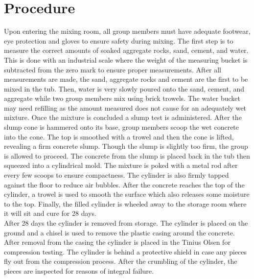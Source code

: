\documentclass{article}
\begin{document}
    \section{Procedure}
    \indent Upon entering the mixing room, all group members must have adequate footwear, eye protection and gloves to ensure safety during mixing. The first step is to measure the correct amounts of soaked aggregate rocks, sand, cement, and water. This is done with an industrial scale where the weight of the measuring bucket is subtracted from the zero mark to ensure proper measurements. After all measurements are made, the sand, aggregate rocks and cement are the first to be mixed in the tub. Then, water is very slowly poured onto the sand, cement, and aggregate while two group members mix using brick trowels. The water bucket may need refilling as the amount measured does not cause for an adequately wet mixture. Once the mixture is concluded a slump test is administered. After the slump cone is hammered onto its base, group members scoop the wet concrete into the cone. The top is smoothed with a trowel and then the cone is lifted, revealing a firm concrete slump. Though the slump is slightly too firm, the group is allowed to proceed. The concrete from the slump is placed back in the tub then squeezed into a cylindrical mold. The mixture is poked with a metal rod after every few scoops to ensure compactness. The cylinder is also firmly tapped against the floor to reduce air bubbles. After the concrete reaches the top of the cylinder, a trowel is used to smooth the surface which also releases some moisture to the top. Finally, the filled cylinder is wheeled away to the storage room where it will sit and cure for 28 days. \\
    \indent After 28 days the cylinder is removed from storage. The cylinder is placed on the ground and a chisel is used to remove the plastic casing around the concrete. After removal from the casing the cylinder is placed in the Tinius Olsen for compression testing. The cylinder is behind a protective shield in case any pieces fly out from the compression process. After the crumbling of the cylinder, the pieces are inspected for reasons of integral failure. 
    \begin{landscape}
    
    \end{landscape}
    \newpage
\end{document}
